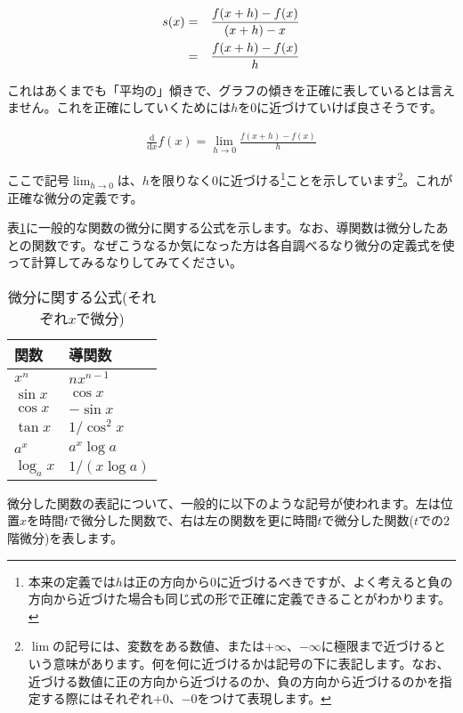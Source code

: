\begin{eqnarray}
    s(x) &=& \frac{f(x+h)-f(x)}{(x+h)-x} \notag \\
    &=&\frac{f(x+h)-f(x)}{h} \notag
\end{eqnarray}

これはあくまでも「平均の」傾きで、グラフの傾きを正確に表しているとは言えません。これを正確にしていくためには$h$を$0$に近づけていけば良さそうです。

\begin{eqnarray}
    \frac{\mathrm{d}}{\mathrm{d}x}f(x) = \lim_{h\to 0}\frac{f(x+h)-f(x)}{h}
    \label{eq:differential-def}
\end{eqnarray}

ここで記号$\lim_{h\to 0}$は、$h$を限りなく$0$に近づける\footnote{本来の定義では$h$は正の方向から$0$に近づけるべきですが、よく考えると負の方向から近づけた場合も同じ式の形で正確に定義できることがわかります。}ことを示しています\footnote{$\lim$の記号には、変数をある数値、または$+\infty$、$-\infty$に極限まで近づけるという意味があります。何を何に近づけるかは記号の下に表記します。なお、近づける数値に正の方向から近づけるのか、負の方向から近づけるのかを指定する際にはそれぞれ$+0$、$-0$をつけて表現します。}。これが正確な微分の定義です。

表\ref{tab:differential}に一般的な関数の微分に関する公式を示します。なお、導関数は微分したあとの関数です。なぜこうなるか気になった方は各自調べるなり微分の定義式を使って計算してみるなりしてみてください。

\begin{table}[htb]
 \begin{center}
  \caption{微分に関する公式(それぞれ$x$で微分)}
  \label{tab:differential}
  \begin{tabular}{l|l}
    \hline
    関数 & 導関数 \\
    \hline \hline
    $x^n$ & $nx^{n-1}$ \\
    $\sin x$ & $\cos x$ \\
    $\cos x$ & $-\sin x$ \\
    $\tan x$ & $1/\cos^2x$ \\
    $a^x$ & $a^x\log a$ \\
    $\log_ax$ & $1/(x\log a)$ \\
    
  \end{tabular}
 \end{center}
\end{table}


微分した関数の表記について、一般的に以下のような記号が使われます。左は位置$x$を時間$t$で微分した関数で、右は左の関数を更に時間$t$で微分した関数($t$での2階微分)を表します。

